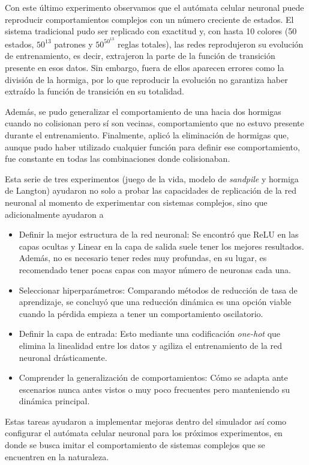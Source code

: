 Con este último experimento observamos que el autómata celular neuronal puede reproducir comportamientos complejos con un número creciente de estados. El sistema tradicional pudo ser replicado con exactitud y, con hasta 10 colores (50 estados, $50^{13}$ patrones y $50^{50^{13}}$ reglas totales), las redes reprodujeron su evolución de entrenamiento, es decir, extrajeron la parte de la función de transición presente en esos datos. Sin embargo, fuera de ellos aparecen errores como la división de la hormiga, por lo que reproducir la evolución no garantiza haber extraído la función de transición en su totalidad.

Además, se pudo generalizar el comportamiento de una hacia dos hormigas cuando no colisionan pero sí son vecinas, comportamiento que no estuvo presente durante el entrenamiento. Finalmente, aplicó la eliminación de hormigas que, aunque pudo haber utilizado cualquier función para definir ese comportamiento, fue constante en todas las combinaciones donde colisionaban.

Esta serie de tres experimentos (juego de la vida, modelo de \textit{sandpile} y hormiga de Langton) ayudaron no solo a probar las capacidades de replicación de la red neuronal al momento de experimentar con sistemas complejos, sino que adicionalmente ayudaron a 
\begin{itemize}
	\item Definir la mejor estructura de la red neuronal: Se encontró que ReLU en las capas ocultas y Linear en la capa de salida suele tener los mejores resultados. Además, no es necesario tener redes muy profundas, en su lugar, es recomendado tener pocas capas con mayor número de neuronas cada una. 

	\item Seleccionar hiperparámetros: Comparando métodos de reducción de tasa de aprendizaje, se concluyó que una reducción dinámica es una opción viable cuando la pérdida empieza a tener un comportamiento oscilatorio. 

	\item Definir la capa de entrada: Esto mediante una codificación \textit{one-hot} que elimina la linealidad entre los datos y agiliza el entrenamiento de la red neuronal drásticamente. 
	
	\item Comprender la generalización de comportamientos: Cómo se adapta ante escenarios nunca antes vistos o muy poco frecuentes pero manteniendo su dinámica principal.
\end{itemize}

Estas tareas ayudaron a implementar mejoras dentro del simulador así como configurar el autómata celular neuronal para los próximos experimentos, en donde se busca imitar el comportamiento de sistemas complejos que se encuentren en la naturaleza.
